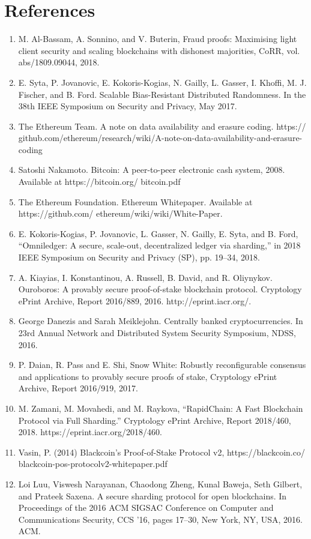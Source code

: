 \documentclass{iacrtrans}
\begin{document}
\section*{References}
\begin{enumerate}
	\item M. Al-Bassam, A. Sonnino, and V. Buterin, Fraud proofs: Maximising light client security and
	scaling blockchains with dishonest majorities, CoRR, vol. abs/1809.09044, 2018.
	\item E. Syta, P. Jovanovic, E. Kokoris-Kogias, N. Gailly, L. Gasser, I. Khoffi, M. J. Fischer, and B. Ford. Scalable Bias-Resistant Distributed Randomness. In the 38th IEEE Symposium on Security and Privacy, May 2017.
	\item The Ethereum Team. A note on data availability and erasure coding. https:// github.com/ethereum/research/wiki/A-note-on-data-availability-and-erasure-coding
	\item Satoshi Nakamoto. Bitcoin: A peer-to-peer electronic cash system, 2008. Available at
	https://bitcoin.org/ bitcoin.pdf
	\item The Ethereum Foundation. Ethereum Whitepaper. Available at https://github.com/ ethereum/wiki/wiki/White-Paper.
	\item E. Kokoris-Kogias, P. Jovanovic, L. Gasser, N. Gailly, E. Syta, and B. Ford, “Omniledger: A secure, scale-out, decentralized ledger via sharding,” in 2018 IEEE Symposium on Security and Privacy (SP), pp. 19–34, 2018.
	\item A. Kiayias, I. Konstantinou, A. Russell, B. David, and R. Oliynykov. Ouroboros: A provably secure proof-of-stake blockchain protocol. Cryptology ePrint Archive, Report 2016/889, 2016. http://eprint.iacr.org/.
	\item George Danezis and Sarah Meiklejohn. Centrally banked cryptocurrencies. In 23rd Annual Network and Distributed System Security Symposium, NDSS, 2016.
	\item P. Daian, R. Pass and E. Shi, Snow White: Robustly reconfigurable consensus and applications to provably secure proofs of stake, Cryptology ePrint Archive, Report 2016/919, 2017.
	\item M. Zamani, M. Movahedi, and M. Raykova, “RapidChain: A Fast Blockchain Protocol via Full Sharding.” Cryptology ePrint Archive, Report 2018/460, 2018. https://eprint.iacr.org/2018/460.
	\item Vasin, P. (2014) Blackcoin's Proof-of-Stake Protocol v2, https://blackcoin.co/ blackcoin-pos-protocolv2-whitepaper.pdf
	\item Loi Luu, Viswesh Narayanan, Chaodong Zheng, Kunal Baweja, Seth Gilbert, and Prateek Saxena. A secure sharding protocol for open blockchains. In Proceedings of the 2016 ACM SIGSAC Conference on Computer and Communications Security, CCS '16, pages 17–30, New York, NY, USA, 2016. ACM.

\end{enumerate}
\end{document}
